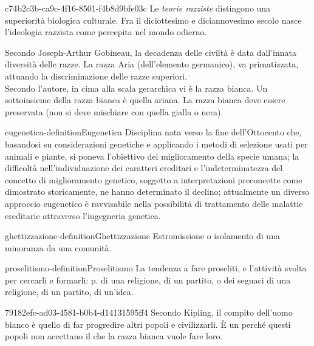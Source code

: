 \documentclass[preview]{standalone}
\begin{document}
\begin{snippet}{c74b2c3b-ca9c-4f16-8501-f4b8d9bfe03c}
    Le \textit{teorie razziste} distingono una superiorità biologica culturale.
    Fra il diciottesimo e diciannovesimo secolo nasce l'ideologia razzista come percepita nel mondo odierno.

    Secondo Joseph-Arthur Gobineau, la decadenza delle civiltà è data dall'innata
    diversità delle razze. La razza Aria (dell'elemento germanico),
    va primatizzata, attuando la discriminazione delle razze superiori.\\
    Secondo l'autore, in cima alla scala gerarchica vi è la razza bianca.
    Un sottoinsieme della razza bianca è quella ariana.
    La razza bianca deve essere preservata (non si deve mischiare con quella gialla o nera).
\end{snippet}

\begin{snippetdefinition}{eugenetica-definition}{Eugenetica}
    Disciplina nata verso la fine dell'Ottocento che, basandosi su considerazioni genetiche e applicando i metodi di selezione usati per animali e piante, si poneva l'obiettivo del miglioramento della specie umana; la difficoltà nell'individuazione dei caratteri ereditari e l'indeterminatezza del concetto di miglioramento genetico, soggetto a interpretazioni preconcette come dimostrato storicamente, ne hanno determinato il declino; attualmente un diverso approccio eugenetico è ravvisabile nella possibilità di trattamento delle malattie ereditarie attraverso l'ingegneria genetica.
\end{snippetdefinition}

\begin{snippetdefinition}{ghettizzazione-definition}{Ghettizzazione}
    Estromissione o isolamento di una minoranza da una comunità.
\end{snippetdefinition}

\begin{snippetdefinition}{proselitismo-definition}{Proselitismo}
    La tendenza a fare proseliti, e l'attività svolta per cercarli e formarli: p. di una religione, di un partito, o dei seguaci di una religione, di un partito, di un'idea.
\end{snippetdefinition}

\begin{snippet}{79182efc-ad03-4581-b0b4-d14131595ff4}
    Secondo Kipling, il compito dell'uomo bianco è quello di far progredire
    altri popoli e civilizzarli. È un 
    perché questi popoli non accettano il  che la razza bianca vuole fare loro.
\end{snippet}
\end{document}
